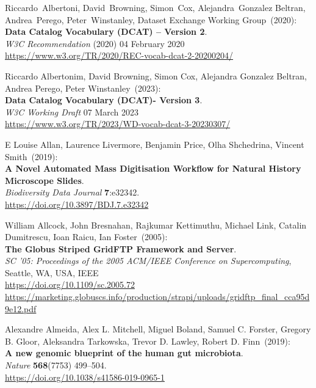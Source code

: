 \begin{thebibliography}{9}
Riccardo~Albertoni, David~Browning, Simon~Cox, Alejandra~Gonzalez Beltran, Andrea~Perego, Peter~Winstanley, Dataset Exchange Working Group~(2020): \\
\textbf{Data Catalog Vocabulary (DCAT) -- Version 2}.\\
\emph{W3C Recommendation} (2020)  04 February 2020 \\
\url{https://www.w3.org/TR/2020/REC-vocab-dcat-2-20200204/}

Riccardo Albertonim, David Browning, Simon Cox, Alejandra Gonzalez Beltran, Andrea Perego, Peter Winstanley~(2023): \\
\textbf{Data Catalog Vocabulary (DCAT)- Version 3}.\\
\emph{W3C Working Draft} 07 March 2023\\
\url{https://www.w3.org/TR/2023/WD-vocab-dcat-3-20230307/}

E Louise Allan, Laurence Livermore, Benjamin Price, Olha Shchedrina, Vincent Smith~(2019): \\
\textbf{A Novel Automated Mass Digitisation Workflow for Natural History Microscope Slides}.\\
\emph{Biodiversity Data Journal} \textbf{7}:e32342.\\
\url{https://doi.org/10.3897/BDJ.7.e32342}

William Allcock, John Bresnahan, Rajkumar Kettimuthu, Michael Link, Catalin Dumitrescu, Ioan Raicu, Ian Foster~(2005): \\
\textbf{The Globus Striped GridFTP Framework and Server}.\\
\emph{{SC '05: Proceedings of the 2005 ACM/IEEE Conference on Supercomputing}},
{Seattle, WA, USA}, {IEEE} \\
\url{https://doi.org/10.1109/sc.2005.72}\\
\url{https://marketing.globuscs.info/production/strapi/uploads/gridftp_final_cca95d9e12.pdf}

Alexandre Almeida, Alex L. Mitchell, Miguel Boland, Samuel C. Forster, Gregory B. Gloor, Aleksandra Tarkowska, Trevor D. Lawley, Robert D. Finn~(2019): \\
\textbf{A new genomic blueprint of the human gut microbiota}.\\
\emph{Nature} \textbf{568}(7753) 499--504.\\
\url{https://doi.org/10.1038/s41586-019-0965-1}


\end{thebibliography}

